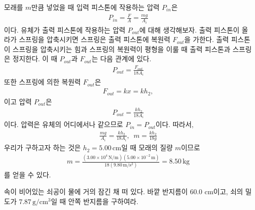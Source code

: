 \documentclass[floatfix,nofootinbib,superscriptaddress,fleqn]{revtex4-2}
\begin{document}
모래를 $m$만큼 넣었을 때 입력 피스톤에 작용하는 압력 $P_{in}$은
 \begin{align}
   P_{in} =\frac{F}{A} =\frac{mg}{A_i}
 \end{align}
 이다. 유체가 출력 피스톤에 작용하는 압력 $P_{out}$에 대해 생각해보자. 
 출력 피스톤이 올라가 
 스프링을 압축시키면 스프링은 출력 피스톤에 복원력 $F_{out}$을 가한다. 
 출력 피스톤이 스프링을 압축시키는 힘과
 스프링의 복원력이 평형을 이룰 때 출력 피스톤과 스프링은 정지한다. 
 이 때 $P_{out}$과 $F_{out}$는 다음 관계에 있다.
 \begin{align}
   P_{out} = \frac{F_{out}}{18A_i}
 \end{align}
 또한 스프링에 의한 복원력 $F_{out}$은
 \begin{align}
   F_{out} = kx = kh_2,
 \end{align}
 이고 압력 $P_{out}$은
 \begin{align}
  P_{out} = \frac{kh_2}{18A_i}
 \end{align}
 이다. 압력은 유체의 어디에서나 같으므로 $P_{in}=P_{out}$이다. 따라서,
 \begin{align}
  \frac{mg}{A_i} = \frac{kh_2}{18A_i},\,\,\,m=\frac{kh_2}{18g}
 \end{align}
 우리가 구하고자 하는 것은 $h_2 = 5.00\,\mathrm{cm}$일 때 
 모래의 질량 $m$이므로
 \begin{align}
   m = \frac{(3.00\times 10^4\,\mathrm{N/m})
   (5.00\times 10^{-2}\,\mathrm{m})}
   {18(9.80\,\mathrm{m/s^2})}
   =8.50\,\mathrm{kg}
 \end{align}
 를 얻을 수 있다.
\vspace{1.cm}


속이 비어있는 쇠공이 물에 거의 잠긴
채 떠 있다. 바깥 반지름이 60.0 cm이고, 쇠의 밀도가
$7.87\,\mathrm{g/cm^3}$일 때 안쪽 반지름을 구하여라.
\end{document}
